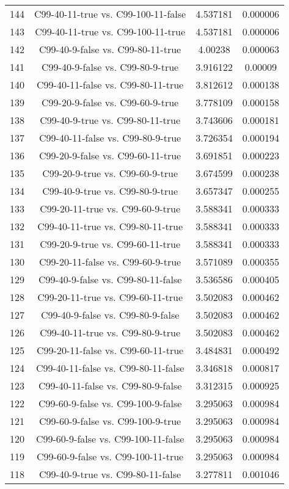 \documentclass[a4paper,10pt]{article}
\begin{document}
\begin{landscape}
\begin{table}[!htp]
\begin{tabular}{cccc}
144&C99-40-11-true vs. C99-100-11-false&4.537181&0.000006\\
143&C99-40-11-true vs. C99-100-11-true&4.537181&0.000006\\
142&C99-40-9-false vs. C99-80-11-true&4.00238&0.000063\\
141&C99-40-9-false vs. C99-80-9-true&3.916122&0.00009\\
140&C99-40-11-false vs. C99-80-11-true&3.812612&0.000138\\
139&C99-20-9-false vs. C99-60-9-true&3.778109&0.000158\\
138&C99-40-9-true vs. C99-80-11-true&3.743606&0.000181\\
137&C99-40-11-false vs. C99-80-9-true&3.726354&0.000194\\
136&C99-20-9-false vs. C99-60-11-true&3.691851&0.000223\\
135&C99-20-9-true vs. C99-60-9-true&3.674599&0.000238\\
134&C99-40-9-true vs. C99-80-9-true&3.657347&0.000255\\
133&C99-20-11-true vs. C99-60-9-true&3.588341&0.000333\\
132&C99-40-11-true vs. C99-80-11-true&3.588341&0.000333\\
131&C99-20-9-true vs. C99-60-11-true&3.588341&0.000333\\
130&C99-20-11-false vs. C99-60-9-true&3.571089&0.000355\\
129&C99-40-9-false vs. C99-80-11-false&3.536586&0.000405\\
128&C99-20-11-true vs. C99-60-11-true&3.502083&0.000462\\
127&C99-40-9-false vs. C99-80-9-false&3.502083&0.000462\\
126&C99-40-11-true vs. C99-80-9-true&3.502083&0.000462\\
125&C99-20-11-false vs. C99-60-11-true&3.484831&0.000492\\
124&C99-40-11-false vs. C99-80-11-false&3.346818&0.000817\\
123&C99-40-11-false vs. C99-80-9-false&3.312315&0.000925\\
122&C99-60-9-false vs. C99-100-9-false&3.295063&0.000984\\
121&C99-60-9-false vs. C99-100-9-true&3.295063&0.000984\\
120&C99-60-9-false vs. C99-100-11-false&3.295063&0.000984\\
119&C99-60-9-false vs. C99-100-11-true&3.295063&0.000984\\
118&C99-40-9-true vs. C99-80-11-false&3.277811&0.001046\\

\end{tabular}
\end{table}
\end{landscape}
\end{document}
